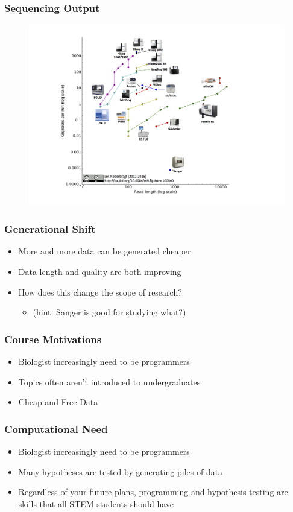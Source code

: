 \documentclass{beamer}
\begin{document}
\begin{frame}
\frametitle{Sequencing Output}
\begin{figure}
\includegraphics[width=0.8\linewidth]{images_20170829_machine_output.jpg}
\end{figure}
\end{frame}
\begin{frame}
\frametitle{Generational Shift}
\begin{itemize}
	\item<1-> More and more data can be generated cheaper
	\item<2-> Data length and quality are both improving
	\item<3-> How does this change the scope of research?
	\begin{itemize}
		\item<4-> (hint: Sanger is good for studying what?)
	\end{itemize}
\end{itemize}
\end{frame}
\begin{frame}
\frametitle{Course Motivations}
\begin{itemize}
	\item Biologist increasingly need to be programmers
	\item Topics often aren't introduced to undergraduates
	\item Cheap and Free Data
\end{itemize}
\end{frame}
\begin{frame}
\frametitle{Computational Need}
\begin{itemize}
	\item Biologist increasingly need to be programmers
	\item Many hypotheses are tested by generating piles of data
	\item Regardless of your future plans, programming and hypothesis testing are skills that all STEM students should have
\end{itemize}
\end{frame}
\end{document}
